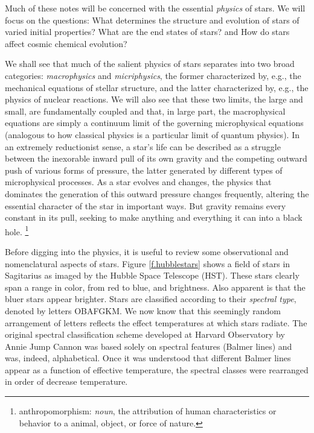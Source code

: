 
Much of these notes will be concerned with the essential {\it physics} of stars.
We will focus on the questions: What determines the structure and evolution of stars of varied initial properties? What are the end states of stars? and How do stars affect cosmic chemical evolution?

We shall see that much of the salient physics of stars separates into two broad categories: {\it macrophysics} and {\it micriphysics}, the former characterized by, e.g., the mechanical equations of stellar structure, and the latter characterized by, e.g., the physics of nuclear reactions.
We will also see that these two limits, the large and small, are fundamentally coupled and that, in large part, the macrophysical equations are simply a continuum limit of the governing microphysical equations (analogous to how classical physics is a particular limit of quantum physics).
In an extremely reductionist sense, a star's life can be described as a struggle between the inexorable inward pull of its own gravity and the competing outward push of various forms of pressure, the latter generated by different types of microphysical processes.
As a star evolves and changes, the physics that dominates the generation of this outward pressure changes frequently, altering the essential character of the star in important ways.
But gravity remains every constant in its pull, seeking to make anything and everything it can into a black hole. \footnote{anthropomorphism: {\it noun}, the attribution of human characteristics or behavior to a animal, object, or force of nature.}

Before digging into the physics, it is useful to review some observational and nomenclatural aspects of stars.
Figure \ref{f.hubblestars} shows a field of stars in Sagitarius as imaged by the Hubble Space Telescope (HST).
These stars clearly span a range in color, from red to blue, and brightness.
Also apparent is that the bluer stars appear brighter.
Stars are classified according to their {\it spectral type}, denoted by letters OBAFGKM.
We now know that this seemingly random arrangement of letters reflects the effect temperatures at which stars radiate.
The original spectral classification scheme developed at Harvard Observatory by Annie Jump Cannon was based solely on spectral features (Balmer lines) and was, indeed, alphabetical.
Once it was understood that different Balmer lines appear as a function of effective temperature, the spectral classes were rearranged in order of decrease temperature.

